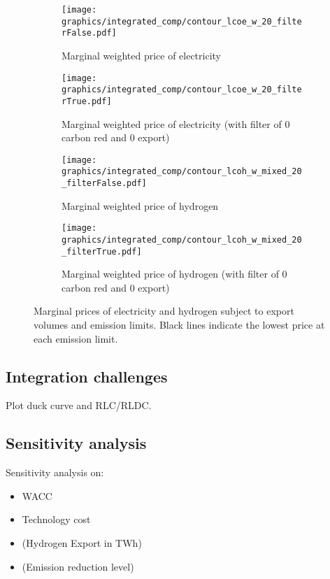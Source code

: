\begin{figure*}[t] %
    \centering
    \begin{subfigure}[b]{0.45\linewidth}
        \centering
        \texttt{[image: graphics/integrated\_comp/contour\_lcoe\_w\_20\_filterFalse.pdf]}
        \caption{Marginal weighted price of electricity}
        \label{fig:contour_plot}
    \end{subfigure}
    \hfill
    \begin{subfigure}[b]{0.45\linewidth}
        \centering
        \texttt{[image: graphics/integrated\_comp/contour\_lcoe\_w\_20\_filterTrue.pdf]}
        \caption{Marginal weighted price of electricity (with filter of 0 carbon red and 0 export)}
        \label{fig:contour_plot}
    \end{subfigure}
    \hfill
    \begin{subfigure}[b]{0.45\linewidth}
        \centering
        \texttt{[image: graphics/integrated\_comp/contour\_lcoh\_w\_mixed\_20\_filterFalse.pdf]}
        \caption{Marginal weighted price of hydrogen}
        \label{fig:contour_plot}
    \end{subfigure}
    \hfill
    \begin{subfigure}[b]{0.45\linewidth}
        \centering
        \texttt{[image: graphics/integrated\_comp/contour\_lcoh\_w\_mixed\_20\_filterTrue.pdf]}
        \caption{Marginal weighted price of hydrogen (with filter of 0 carbon red and 0 export)}
        \label{fig:contour_plot_totalsystem}
    \end{subfigure}
    \hfill

    \caption{Marginal prices of electricity and hydrogen subject to export volumes and emission limits. Black lines indicate the lowest price at each emission limit.}
    \label{fig:comparison}
\end{figure*}


\subsection{Integration challenges}
Plot duck curve and RLC/RLDC.

\subsection{Sensitivity analysis}
Sensitivity analysis on:
\begin{itemize}
    \item WACC
    \item Technology cost
    \item (Hydrogen Export in TWh)
    \item (Emission reduction level)
\end{itemize}


